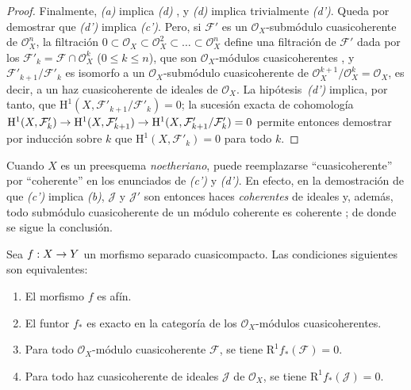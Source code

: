 \documentclass[oneside,10pt]{amsart}
\makeatletter
\renewcommand{\leq}{\leqslant}
\newcommand{\ega@arrow}[2]{\mathchoice{#1}{#2}{#2}{#2}}
\renewcommand{\to}{\ega@arrow{\longrightarrow}{\rightarrow}}
\let\EGAOriginalLabel\label
\renewcommand{\label}[1]{\phantomsection\EGAOriginalLabel{#1}}
\makeatother
\begin{document}
\begin{proof}
Finalmente, \emph{(a)} implica \emph{(d)} , y \emph{(d)} implica trivialmente \emph{(d')}.
Queda por demostrar que \emph{(d')} implica \emph{(c')}.
Pero, si $\mathcal{F}'$ es un $\mathcal{O}_X$-submódulo cuasicoherente de $\mathcal{O}_X^n$, la filtración $0\subset\mathcal{O}_X\subset\mathcal{O}_X^2\subset\ldots\subset
\mathcal{O}_X^n$ define una filtración de $\mathcal{F}'$ dada por los $\mathcal{F}'_k=\mathcal{F}\cap\mathcal{O}_X^k$ ($0\leq k\leq n$), que son $\mathcal{O}_X$-módulos cuasicoherentes , y $\mathcal{F}'_{k+1}/\mathcal{F}'_k$ es isomorfo a un $\mathcal{O}_X$-submódulo cuasicoherente de $\mathcal{O}_X^{k+1}/\mathcal{O}_X^k=\mathcal{O}_X$, es decir, a un haz cuasicoherente de ideales de $\mathcal{O}_X$.
La hipótesis~\emph{(d')} implica, por tanto, que $\mathrm{H}^1(X,\mathcal{F}'_{k+1}/\mathcal{F}'_k)=0$;
la sucesión exacta de cohomología $\mathrm{H}^1(X,\mathcal{F}'_k)\to\mathrm{H}^1(X,\mathcal{F}'_{k+1})
\to\mathrm{H}^1(X,\mathcal{F}'_{k+1}/\mathcal{F}'_k)=0$ permite entonces demostrar por inducción sobre $k$ que $\mathrm{H}^1(X,\mathcal{F}'_k)=0$ para todo $k$.
\end{proof}

\begin{remark}[5.2.1.1]
\label{II.5.2.1.1-fr}
Cuando $X$ es un preesquema \emph{noetheriano}, puede reemplazarse ``cuasicoherente'' por ``coherente'' en los enunciados de \emph{(c')} y \emph{(d')}.
En efecto, en la demostración de que \emph{(c')} implica \emph{(b)}, $\mathcal{J}$ y $\mathcal{J}'$ son entonces haces \emph{coherentes} de ideales y, además, todo submódulo cuasicoherente de un módulo coherente es coherente ;
de donde se sigue la conclusión.
\end{remark}

\begin{corollary}[5.2.2]
\label{II.5.2.2-fr}
Sea $f:X\to Y$ un morfismo separado cuasicompacto.
Las condiciones siguientes son equivalentes:
\begin{enumerate}
  \item[{\rm(a)}] El morfismo $f$ es afín.
  \item[{\rm(b)}] El funtor $f_*$ es exacto en la categoría de los $\mathcal{O}_X$-módulos cuasicoherentes.
  \item[{\rm(c)}] Para todo $\mathcal{O}_X$-módulo cuasicoherente $\mathcal{F}$, se tiene $\mathrm{R}^1f_*(\mathcal{F})=0$.
  \item[{\rm(c')}] Para todo haz cuasicoherente de ideales $\mathcal{J}$ de $\mathcal{O}_X$, se tiene $\mathrm{R}^1f_*(\mathcal{J})=0$.
\end{enumerate}
\end{corollary}
\end{document}
